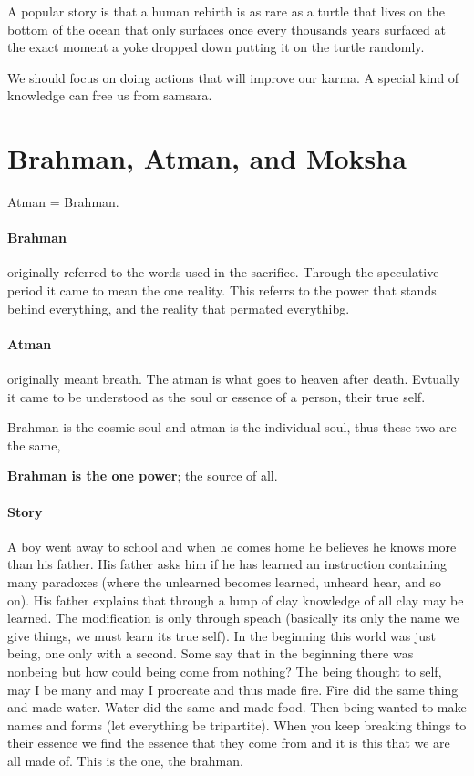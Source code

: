 \documentclass{article}
\begin{document}
A popular story is that a human rebirth is as rare as a turtle that lives on the bottom of the ocean that only surfaces once every thousands years surfaced at the exact moment a yoke dropped down putting it on the turtle randomly.

We should focus on doing actions that will improve our karma. A special kind of knowledge can free us from samsara.

\section*{Brahman, Atman, and Moksha}
\label{sec:brahman_atman_and_moksha}
Atman = Brahman.

\paragraph{Brahman}
\label{par:brahman}
originally referred to the words used in the sacrifice. Through the speculative period it came to mean the one reality. This referrs to the power that stands behind everything, and the reality that permated everythibg.

\paragraph{Atman}
\label{par:atman}
originally meant breath. The atman is what goes to heaven after death. Evtually it came to be understood as the soul or essence of a person, their true self.

Brahman is the cosmic soul and atman is the individual soul, thus these two are the same,

\textbf{Brahman is the one power}; the source of all.

\paragraph{Story}
\label{par:story}
A boy went away to school and when he comes home he believes he knows more than his father. His father asks him if he has learned an instruction containing many paradoxes (where the unlearned becomes learned, unheard hear, and so on). His father explains that through a lump of clay knowledge of all clay may be learned. The modification is only through speach (basically its only the name we give things, we must learn its true self). In the beginning this world was just being, one only with a second. Some say that in the beginning there was nonbeing but how could being come from nothing? The being thought to self, may I be many and may I procreate and thus made fire. Fire did the same thing and made water. Water did the same and made food. Then being wanted to make names and forms (let everything be tripartite). When you keep breaking things to their essence we find the essence that they come from and it is this that we are all made of. This is the one, the brahman.
\end{document}
